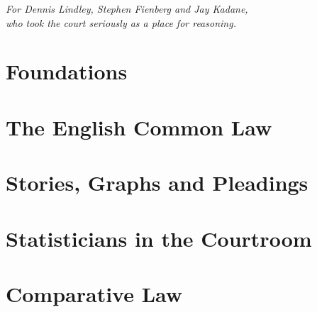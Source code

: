 \documentclass[11pt,openany,twoside]{book}
\begin{document}
\vspace*{2.4in}
\begin{center}
\itshape For Dennis Lindley, Stephen Fienberg and Jay Kadane,\\
who took the court seriously as a place for reasoning.
\end{center}
\clearpage

\pagestyle{fancy}
\tableofcontents
\listoffigures


\mainmatter
\part{Foundations}









\part{The English Common Law}









\part{Stories, Graphs and Pleadings}





\part{Statisticians in the Courtroom}








\part{Comparative Law}





\end{document}
